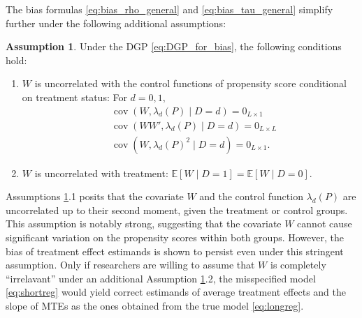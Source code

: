 \documentclass[11pt]{article}
\theoremstyle{definition}
\newtheorem{assumption}{Assumption}
\DeclareMathOperator{\cov}{cov}
\newcommand{\Exp}{\ensuremath{\mathbb{E}}} %
\newcommand{\0}{\ensuremath{\mathbf{0}}}
\begin{document}
\begin{bibunit}
The bias formulas \eqref{eq:bias_rho_general} and \eqref{eq:bias_tau_general} simplify further under the following additional assumptions:
\begin{assumption}
    \label{asp:weak_exogeneous_covariates}
    Under the DGP \eqref{eq:DGP_for_bias}, the following conditions hold:
    \begin{enumerate}
        \item $W$ is uncorrelated with the control functions of propensity score conditional on treatment status: For $d = 0,1,$
        \begin{align*}
        & \cov(W, \lambda_d(P)\mid D=d) = 0_{L\times 1} \\  &\cov(WW',\lambda_d(P)\mid D=d) = 0_{L\times L} \\
        &\cov(W, \lambda_d(P)^2\mid D=d) = 0_{L\times 1}.
        \end{align*}
        \item $W$ is uncorrelated with treatment: $\Exp[W\mid D=1] = \Exp[W\mid D=0].$
    \end{enumerate}
\end{assumption}
Assumptions \ref{asp:weak_exogeneous_covariates}.1 posits that the covariate $W$ and the control function $\lambda_d(P)$ are uncorrelated up to their second moment, given the treatment or control groups. This assumption is notably strong, suggesting that the covariate $W$ cannot cause significant variation on the propensity scores within both groups. However, the bias of treatment effect estimands is shown to persist even under this stringent assumption. Only if researchers are willing to assume that $W$ is completely ``irrelavant''  under an additional Assumption \ref{asp:weak_exogeneous_covariates}.2, the misspecified model \eqref{eq:shortreg} would yield correct estimands of average treatment effects and the slope of MTEs as the ones obtained from the true model \eqref{eq:longreg}.


\end{bibunit}
\end{document}
